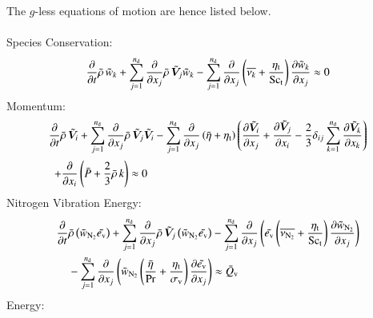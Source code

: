 \documentclass{warpdoc}
\newcommand{\alb}{\vspace{0.2cm}\\} %
\newcommand{\Sct}{{{\rm Sc}_{\rm t}}}
\newcommand{\nd}{{{n}_{\rm d}}}
\newcommand{\turb}{_{\rm t}}
\newcommand{\etat}{{\eta\turb}}
\newcommand{\mfd}{\displaystyle}
\newcommand{\ev}{e_{\rm v}}
\newcommand{\sigmav}{\sigma_{\rm v}}
\begin{document}
The $g$-less equations of motion are hence listed below.
%
\\  \\Species Conservation:
\begin{displaymath}
  \mfd\frac{\partial}{\partial t}  \wbar{\rho}\,  {\wtilde{w}_k}
      +  \sum_{j=1}^{\nd} \frac{\partial }{\partial x_j}
        \wbar{\rho}\, {\wtilde{\bm{V}}_j} {\wtilde{w}_k}
      -  \sum_{j=1}^{\nd} \frac{\partial }{\partial x_j}
             \left( \overline{\nu_k} + \frac{\etat}{\Sct} \right)
              \frac{\partial {\wtilde{w}_k}}{\partial x_j}
      \approx 0
\end{displaymath}
%
Momentum:
\begin{displaymath}
 \begin{array}{l}
  \mfd\frac{\partial}{\partial t}  \wbar{\rho}\,  {\wtilde{\bm{V}}_i}
      +  \sum_{j=1}^{\nd} \frac{\partial }{\partial x_j}
             \wbar{\rho}\, {\wtilde{\bm{V}}_j} {\wtilde{\bm{V}}_i}
      - \sum_{j=1}^{\nd} \frac{\partial }{\partial x_j}
            \left( \wbar{\eta}+\etat \right)
          \left(
                \frac{\partial {\wtilde{\bm{V}}_i}}{\partial x_j}
              + \frac{\partial {\wtilde{\bm{V}}_j}}{\partial x_i}
              - \frac{2}{3} \delta_{ij} \sum_{k=1}^\nd \frac{\partial {\wtilde{\bm{V}}_k}}{\partial x_k}
          \right) \alb~~
     \mfd  +  \frac{\partial }{\partial x_i} \left( \wbar{P}  +  \frac{2}{3} \wbar{\rho}\, k\right)
      \approx 0
 \end{array}
\end{displaymath}
%
%
Nitrogen Vibration Energy:
%
\begin{align}
 \frac{\partial}{\partial t} &\wbar{\rho} \left( {\wtilde{w}_{\rm N_2}}  \wtilde{\ev} \right)
  + \sum_{j=1}^{\nd} \frac{\partial}{\partial x_j} \wbar{\rho}\, {\wtilde{\bm{V}}_j} \left( {\wtilde{w}_{\rm N_2}} {\wtilde{\ev}} \right)
  -  \sum_{j=1}^{\nd} \frac{\partial}{\partial x_j}\left({\wtilde{\ev}} \left(\overline{\nu_{\rm N_2}}+ \frac{\etat}{\Sct}\right) \frac{\partial {\wtilde{w}_{\rm N_2}}}{\partial x_j}\right)\nonumber\alb
  &-  \sum_{j=1}^{\nd} \frac{\partial}{\partial x_j}\left({\wtilde{w}_{\rm N_2}} \left(\frac{\wbar{\eta}}{\Pr}+\frac{\etat}{\sigmav}\right) \frac{\partial \wtilde{\ev}}{\partial x_j}\right)
 \approx \wbar{Q}_{\rm v}
\end{align}
%
Energy:
%
\end{document}
